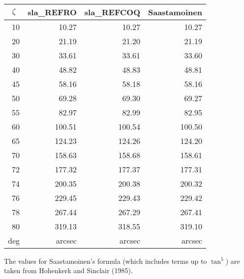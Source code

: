 \documentclass[11pt,twoside]{article}
\begin{document}
{\begin{enumerate}
        ~~~~~~~~~~
        \begin{tabular}{|r|r|r|r|} \hline
        \multicolumn{1}{|c}{$\zeta$} &
        \multicolumn{1}{|c}{sla\_REFRO} &
        \multicolumn{1}{|c}{sla\_REFCOQ} &
        \multicolumn{1}{|c|}{Saastamoinen} \\ \hline
        10 &  10.27 &  10.27 &  10.27 \\
        20 &  21.19 &  21.20 &  21.19 \\
        30 &  33.61 &  33.61 &  33.60 \\
        40 &  48.82 &  48.83 &  48.81 \\
        45 &  58.16 &  58.18 &  58.16 \\
        50 &  69.28 &  69.30 &  69.27 \\
        55 &  82.97 &  82.99 &  82.95 \\
        60 & 100.51 & 100.54 & 100.50 \\
        65 & 124.23 & 124.26 & 124.20 \\
        70 & 158.63 & 158.68 & 158.61 \\
        72 & 177.32 & 177.37 & 177.31 \\
        74 & 200.35 & 200.38 & 200.32 \\
        76 & 229.45 & 229.43 & 229.42 \\
        78 & 267.44 & 267.29 & 267.41 \\
        80 & 319.13 & 318.55 & 319.10 \\ \hline
        deg & arcsec & arcsec & arcsec \\ \hline
        \end{tabular}

        \vspace{3ex}

        The values for Saastamoinen's formula (which includes terms
        up to $\tan^5$) are taken from Hohenkerk and Sinclair (1985).


\end{enumerate}}
\end{document}
